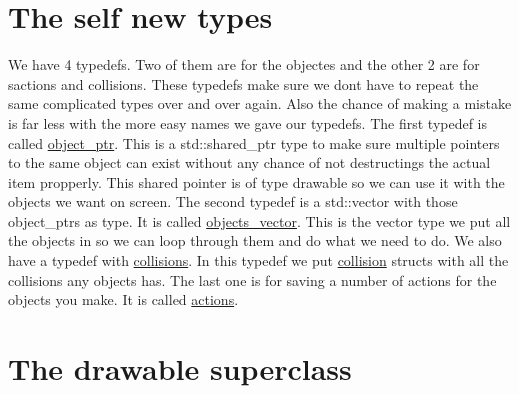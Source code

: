 \hypertarget{index_typedefs}{}\section{The self new types}\label{index_typedefs}
We have 4 typedefs. Two of them are for the objectes and the other 2 are for sactions and collisions. These typedefs make sure we dont have to repeat the same complicated types over and over again. Also the chance of making a mistake is far less with the more easy names we gave our typedefs. The first typedef is called \hyperlink{typedefs_8hpp_aab5add95f06d2ba25dbfed8eb07274fa}{object\+\_\+ptr}. This is a std\+::shared\+\_\+ptr type to make sure multiple pointers to the same object can exist without any chance of not destructings the actual item propperly. This shared pointer is of type drawable so we can use it with the objects we want on screen. The second typedef is a std\+::vector with those object\+\_\+ptrs as type. It is called \hyperlink{typedefs_8hpp_a6c0fdb1dfd0c34dbbdbb5dcd3c608b07}{objects\+\_\+vector}. This is the vector type we put all the objects in so we can loop through them and do what we need to do. We also have a typedef with \hyperlink{typedefs_8hpp_a7e1a7f34f6d09dabb4cdafd6e4118603}{collisions}. In this typedef we put \hyperlink{structcollision}{collision} structs with all the collisions any objects has. The last one is for saving a number of actions for the objects you make. It is called \hyperlink{typedefs_8hpp_a38f93e4749e0d65d51360c429766d212}{actions}.\hypertarget{index_drawable}{}\section{The drawable superclass}\label{index_drawable}
